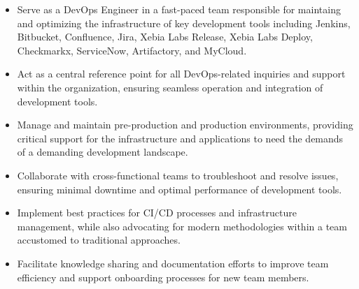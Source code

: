 \documentclass[10pt,a4paper,photo]{altacv}
\begin{document}
\begin{itemize}
\item Serve as a DevOps Engineer in a fast-paced team responsible for maintaing and optimizing the infrastructure of key development tools including Jenkins, Bitbucket, Confluence, Jira, Xebia Labs Release, Xebia Labs Deploy, Checkmarkx, ServiceNow, Artifactory, and MyCloud.
\item Act as a central reference point for all DevOps-related inquiries and support within the organization, ensuring seamless operation and integration of development tools.
\item Manage and maintain pre-production and production environments, providing critical support for the infrastructure and applications to need the demands of a demanding development landscape.
\item Collaborate with cross-functional teams to troubleshoot and resolve issues, ensuring minimal downtime and optimal performance of development tools.
\item Implement best practices for CI/CD processes and infrastructure management, while also advocating for modern methodologies within a team accustomed to traditional approaches.
\item Facilitate knowledge sharing and documentation efforts to improve team efficiency and support onboarding processes for new team members.

\end{itemize}

\divider



\vspace{3mm}



\divider
{}
\vspace{7mm}
\end{document}
